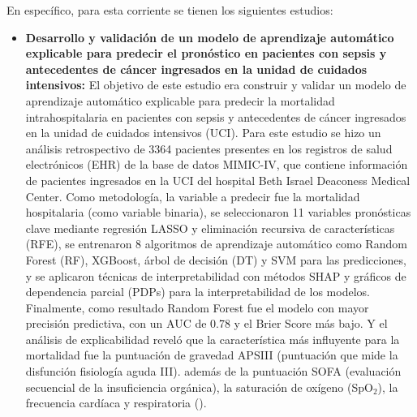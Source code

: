 En específico, para esta corriente se tienen los siguientes estudios:
\begin{itemize}
    \item \textbf{Desarrollo y validación de un modelo de aprendizaje automático explicable para predecir el pronóstico en pacientes con sepsis y antecedentes de cáncer ingresados ​​en la unidad de cuidados intensivos:} El objetivo de este estudio era construir y validar un modelo de aprendizaje automático explicable para predecir la mortalidad intrahospitalaria en pacientes con sepsis y antecedentes de cáncer ingresados en la unidad de cuidados intensivos (UCI). Para este estudio se hizo un análisis retrospectivo de 3364 pacientes presentes en los registros de salud electrónicos (EHR) de la base de datos MIMIC-IV, que contiene información de pacientes ingresados en la UCI del hospital Beth Israel Deaconess Medical Center. Como metodología, la variable a predecir fue la mortalidad hospitalaria (como variable binaria), se seleccionaron 11 variables pronósticas clave mediante regresión LASSO y eliminación recursiva de características (RFE), se entrenaron 8 algoritmos de aprendizaje automático como Random Forest (RF), XGBoost, árbol de decisión (DT) y SVM para las predicciones, y se aplicaron técnicas de interpretabilidad con métodos SHAP y gráficos de dependencia parcial (PDPs) para la interpretabilidad de los modelos. Finalmente, como resultado Random Forest fue el modelo con mayor precisión predictiva, con un AUC de 0.78 y el Brier Score más bajo. Y el análisis de explicabilidad reveló que la característica más influyente para la mortalidad fue la puntuación de gravedad APSIII (puntuación que mide la disfunción fisiología aguda III). además de la puntuación SOFA (evaluación secuencial de la insuficiencia orgánica), la saturación de oxígeno (SpO$_2$), la frecuencia cardíaca y respiratoria (\cite{article1}).

\end{itemize}
